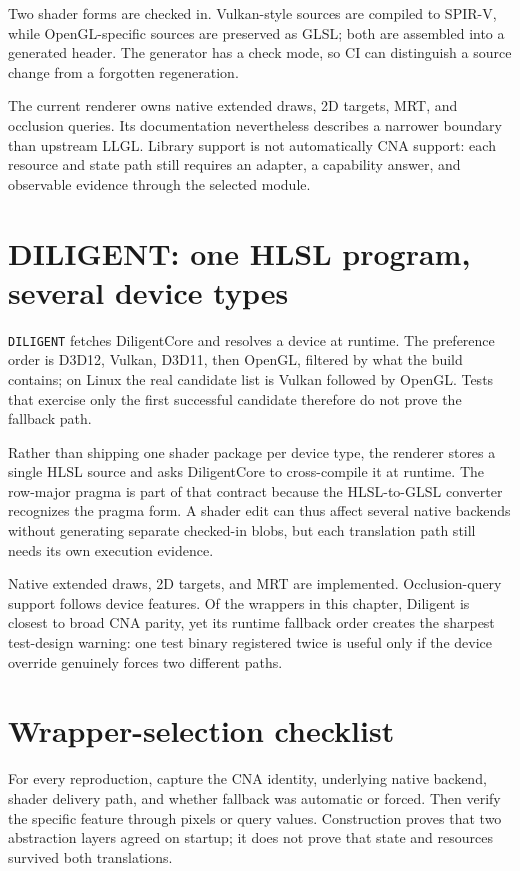Two shader forms are checked in.  Vulkan-style sources are compiled to SPIR-V, while
OpenGL-specific sources are preserved as GLSL; both are assembled into a generated header.
The generator has a check mode, so CI can distinguish a source change from a forgotten
regeneration.

The current renderer owns native extended draws, 2D targets, MRT, and occlusion queries.  Its
documentation nevertheless describes a narrower boundary than upstream LLGL.  Library
support is not automatically CNA support: each resource and state path still requires an
adapter, a capability answer, and observable evidence through the selected module.

\section{DILIGENT: one HLSL program, several device types}

\texttt{DILIGENT} fetches DiligentCore and resolves a device at runtime.  The preference order
is D3D12, Vulkan, D3D11, then OpenGL, filtered by what the build contains; on Linux the real
candidate list is Vulkan followed by OpenGL.  Tests that exercise only the first successful
candidate therefore do not prove the fallback path.

Rather than shipping one shader package per device type, the renderer stores a single HLSL
source and asks DiligentCore to cross-compile it at runtime.  The row-major pragma is part of
that contract because the HLSL-to-GLSL converter recognizes the pragma form.  A shader edit
can thus affect several native backends without generating separate checked-in blobs, but
each translation path still needs its own execution evidence.

Native extended draws, 2D targets, and MRT are implemented.  Occlusion-query support follows
device features.  Of the wrappers in this chapter, Diligent is closest to broad CNA parity,
yet its runtime fallback order creates the sharpest test-design warning: one test binary
registered twice is useful only if the device override genuinely forces two different paths.

\section{Wrapper-selection checklist}

For every reproduction, capture the CNA identity, underlying native backend, shader delivery
path, and whether fallback was automatic or forced.  Then verify the specific feature through
pixels or query values.  Construction proves that two abstraction layers agreed on startup;
it does not prove that state and resources survived both translations.
